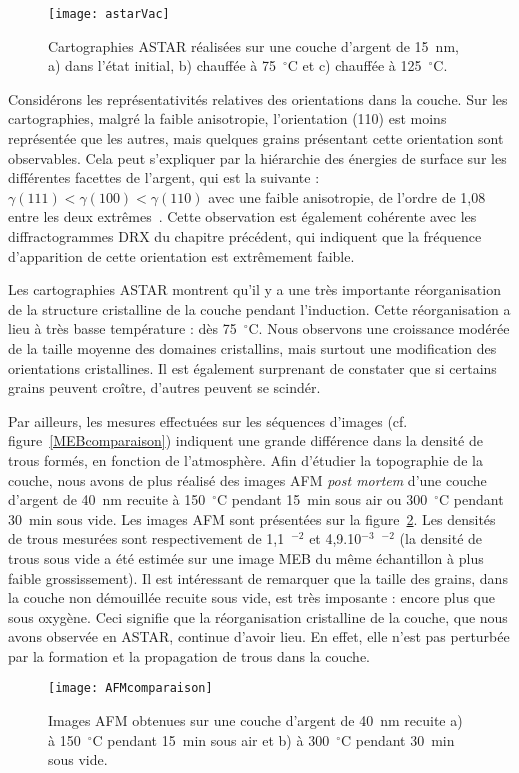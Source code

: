 \begin{figure}[!htb]
\centering
\texttt{[image: astarVac]}
\caption{Cartographies ASTAR réalisées sur une couche d'argent de 15~nm, a) dans l'état initial, b) chauffée à 75~$^\circ$C et c) chauffée à 125~$^\circ$C.}
\label{astarVac}
\end{figure}
Considérons les représentativités relatives des orientations dans la couche. Sur les cartographies, malgré la faible anisotropie, l'orientation (110) est moins représentée que les autres, mais quelques grains présentant cette orientation sont observables. Cela peut s'expliquer par la hiérarchie des énergies de surface sur les différentes facettes de l'argent, qui est la suivante : $\gamma(111) < \gamma(100) < \gamma(110)$ avec une faible anisotropie, de l'ordre de 1,08 entre les deux extrêmes~\cite{stankic2013equilibrium, molina2011size}. Cette observation est également cohérente avec les diffractogrammes DRX du chapitre précédent, qui indiquent que la fréquence d'apparition de cette orientation est extrêmement faible.\par 
Les cartographies ASTAR montrent qu'il y a une très importante réorganisation de la structure cristalline de la couche pendant l'induction. Cette réorganisation a lieu à très basse température : dès 75~$^\circ$C. Nous observons une croissance modérée de la taille moyenne des domaines cristallins, mais surtout une modification des orientations cristallines. Il est également surprenant de constater que si certains grains peuvent croître, d'autres peuvent se scindér.\par 
Par ailleurs, les mesures effectuées sur les séquences d'images (cf. figure~\ref{MEBcomparaison}) indiquent une grande différence dans la densité de trous formés, en fonction de l'atmosphère. Afin d'étudier la topographie de la couche, nous avons de plus réalisé des images AFM \textit{post mortem} d'une couche d'argent de 40~nm recuite à 150~$^\circ$C pendant 15~min sous air ou 300~$^\circ$C pendant 30~min sous vide. Les images AFM sont présentées sur la figure~\ref{AFMcomparaison}. Les densités de trous mesurées sont respectivement de 1,1~\micro\meter$^{-2}$ et 4,9.10$^{-3}$~\micro\meter$^{-2}$ (la densité de trous sous vide a été estimée sur une image MEB du même échantillon à plus faible grossissement). Il est intéressant de remarquer que la taille des grains, dans la couche non démouillée recuite sous vide, est très imposante : encore plus que sous oxygène. Ceci signifie que la réorganisation cristalline de la couche, que nous avons observée en ASTAR, continue d'avoir lieu. En effet, elle n'est pas perturbée par la formation et la propagation de trous dans la couche.
\begin{figure}[!htb]
\centering
\texttt{[image: AFMcomparaison]}
\caption{Images AFM obtenues sur une couche d'argent de 40~nm recuite a) à 150~$^\circ$C pendant 15~min sous air et b) à 300~$^\circ$C pendant 30~min sous vide.}
\label{AFMcomparaison}
\end{figure}
